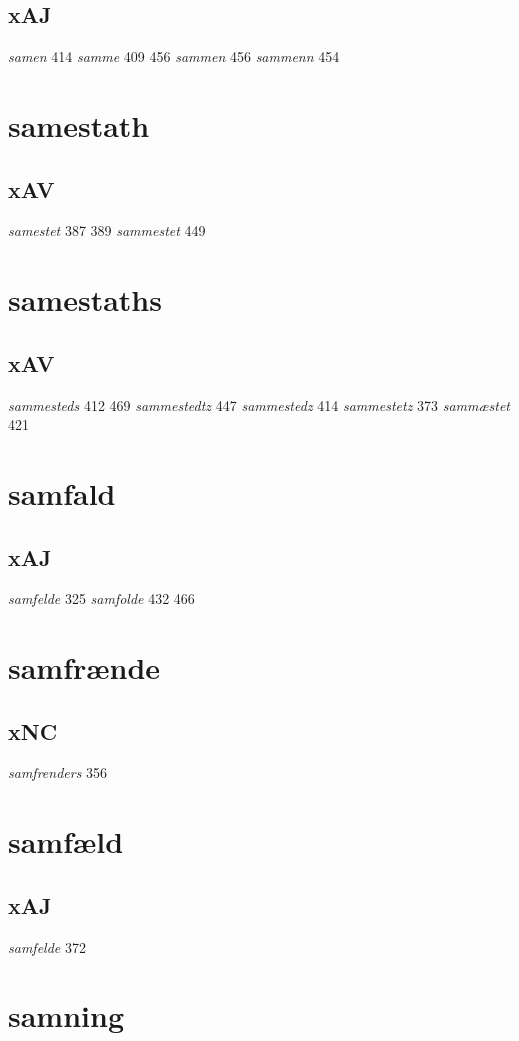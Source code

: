 \documentclass[a4paper,twocolumn]{article}
\begin{document}
\subsection{xAJ}
\label{sec:org5edc8a8}
\emph{samen} 414 \emph{samme} 409 456 \emph{sammen} 456 \emph{sammenn} 454 
\section{samestath}
\label{sec:org92cff89}
\subsection{xAV}
\label{sec:org1da1fa4}
\emph{samestet} 387 389 \emph{sammestet} 449 
\section{samestaths}
\label{sec:orgbf35774}
\subsection{xAV}
\label{sec:org827ce8f}
\emph{sammesteds} 412 469 \emph{sammestedtz} 447 \emph{sammestedz} 414 \emph{sammestetz} 373 \emph{sammæstet} 421 
\section{samfald}
\label{sec:org38c335b}
\subsection{xAJ}
\label{sec:orgd146489}
\emph{samfelde} 325 \emph{samfolde} 432 466 
\section{samfrænde}
\label{sec:orgb4a2e09}
\subsection{xNC}
\label{sec:org14601a2}
\emph{samfrenders} 356 
\section{samfæld}
\label{sec:orgc667d5b}
\subsection{xAJ}
\label{sec:orgc03a14c}
\emph{samfelde} 372 
\section{samning}
\label{sec:orgb6a99c3}
\end{document}

